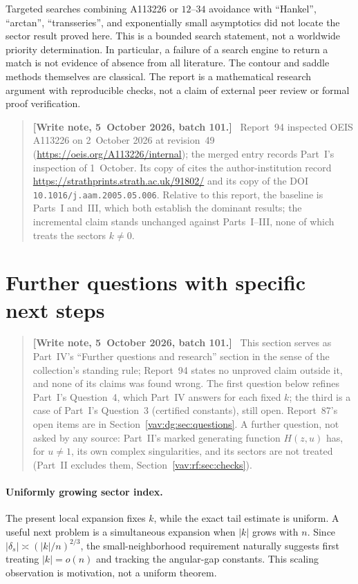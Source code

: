 \documentclass[11pt]{article}
\theoremstyle{remark}\newtheorem{remark}[theorem]{Remark}
\newenvironment{writenoteb}{\begin{quote}\small\raggedright\textbf{[Write note, 5~October 2026, batch 101.]}\ }{\end{quote}}
\begin{document}
Targeted searches combining A113226 or $12$--$34$ avoidance with ``Hankel'', ``arctan'', ``transseries'', and exponentially small asymptotics did not locate the sector result proved here. This is a bounded search statement, not a worldwide priority determination. In particular, a failure of a search engine to return a match is not evidence of absence from all literature. The contour and saddle methods themselves are classical. The report is a mathematical research argument with reproducible checks, not a claim of external peer review or formal proof verification.
\begin{writenoteb}
Report~94 inspected OEIS A113226 on 2~October 2026 at revision~49
(\url{https://oeis.org/A113226/internal}); the merged entry \cite{oeis} records
Part~I's inspection of 1~October. Its copy of \cite{bck} cites the
author-institution record \url{https://strathprints.strath.ac.uk/91802/} and
its copy of \cite{elizalde} the DOI \texttt{10.1016/j.aam.2005.05.006}.
Relative to this report, the baseline is Parts~I and~III, which both
establish the dominant results; the incremental claim stands unchanged
against Parts~I--III, none of which treats the sectors $k\ne0$.
\end{writenoteb}

\section{Further questions with specific next steps}\label{vav:hk:sec:questions}
\begin{writenoteb}
This section serves as Part~IV's ``Further questions and research''
section in the sense of the collection's standing rule; Report~94 states no
unproved claim outside it, and none of its claims was found wrong. The
first question below refines Part~I's Question~4, which Part~IV answers
for each fixed $k$; the third is a case of Part~I's Question~3 (certified
constants), still open. Report~87's open items are in
Section~\ref{vav:dg:sec:questions}. A further question, not asked by any
source: Part~II's marked generating function $H(z,u)$ has, for $u\ne1$,
its own complex singularities, and its sectors are not treated
(Part~II excludes them, Section~\ref{vav:rf:sec:checks}).
\end{writenoteb}
\paragraph{Uniformly growing sector index.}
The present local expansion fixes $k$, while the exact tail estimate is uniform. A useful next problem is a simultaneous expansion when $|k|$ grows with $n$. Since $|\delta_s|\asymp(|k|/n)^{2/3}$, the small-neighborhood requirement naturally suggests first treating $|k|=o(n)$ and tracking the angular-gap constants. This scaling observation is motivation, not a uniform theorem.
\end{document}
